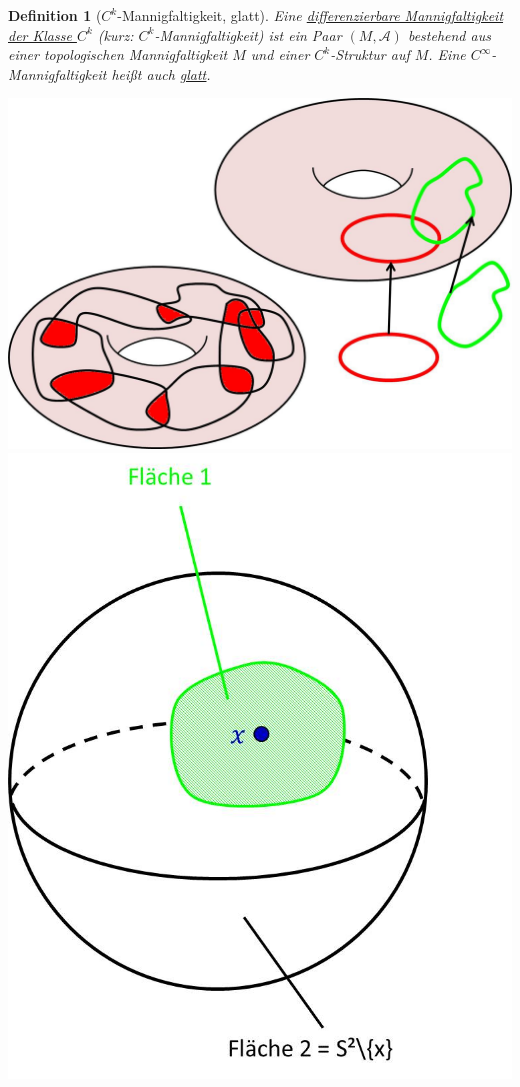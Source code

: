\documentclass[a4paper,11pt,notitlepage]{report}
\newtheorem{definition}{Definition}[chapter]
\begin{document}
\begin{definition}[$C^k$-Mannigfaltigkeit, glatt]
	Eine \underline{differenzierbare Mannigfaltigkeit der Klasse $C^k$} (kurz: $C^k$-Mannigfaltigkeit) ist ein Paar $(M,\mathcal{A})$ bestehend aus einer topologischen Mannigfaltigkeit $M$ und einer $C^k$-Struktur auf $M$. Eine $C^\infty$-Mannigfaltigkeit heißt auch \underline{\underline{glatt}}.
	\newline
\end{definition}
\includegraphics[scale=0.4]{images/Verkleben.jpg}
\includegraphics[scale=0.4]{images/Verkleben_S2.jpg}
\end{document}
